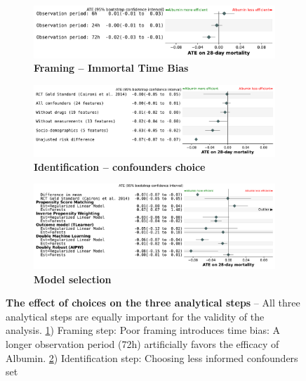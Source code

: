 \documentclass[10pt,letterpaper]{article}
\begin{document}
\begin{figure}[h!]
  \begin{subfigure}[b]{\linewidth}
    \caption{\bfseries Framing -- Immortal Time Bias}\label{fig:vibration:itb}
    \includegraphics[width=0.765\linewidth, right]{img_main/itb__dr_forest_agg_first_last__bs_30_shared_x_axis.pdf}
  \end{subfigure}
  \vfill
  \begin{subfigure}[b]{\linewidth}
    \centering
    \caption{\bfseries Identification -- confounders choice}\label{fig:vibration:confounders}
    \includegraphics[width=.9\linewidth, right]{img_main/sensitivity_confounders_main_shared_x_axis.pdf}
  \end{subfigure}
  \vfill
  \begin{subfigure}[b]{\linewidth}
    \centering
    \caption{\bfseries Model selection}\label{fig:vibration:models}
    \includegraphics[width=0.891\linewidth, right]{img_main/estimates_20230712__est_lr_rf__bs_50_shared_x_axis.pdf}
  \end{subfigure}
  \vfill
  \caption{\textbf{The effect of choices on the three
      analytical steps} -- All three
    analytical steps are equally important for the validity of the analysis.
    \ref{fig:vibration:itb}) Framing step: Poor framing introduces time bias: A longer
    observation period (72h) artificially favors the efficacy of Albumin.
    \ref{fig:vibration:confounders}) Identification step: Choosing less informed confounders set
}
\end{figure}
\end{document}
